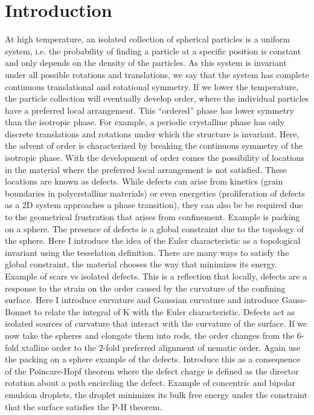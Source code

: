 \chapter{Introduction}
At high temperature, an isolated collection of spherical particles is a uniform system, i.e. the probability of finding a particle at a specific position is constant and only depends on the density of the particles.
As this system is invariant under all possible rotations and translations, we say that the system has complete continuous translational and rotational symmetry.
If we lower the temperature, the particle collection will eventually develop order, where the individual particles have a preferred local arrangement.
This ``ordered'' phase has lower symmetry than the isotropic phase.
For example, a periodic crystalline phase has only discrete translations and rotations under which the structure is invariant.
Here, the advent of order is characterized by breaking the continuous symmetry of the isotropic phase.
With the development of order comes the possibility of locations in the material where the preferred local arrangement is not satisfied.
These locations are known as defects.
While defects can arise from kinetics (grain boundaries in polycrstalline materials) or even energetics (proliferation of defects as a 2D system approaches a phase transition), they can also be be required due to the geometrical frustration that arises from confinement.
Example is packing on a sphere.
The presence of defects is a global constraint due to the topology of the sphere.
Here I introduce the idea of the Euler characteristic as a topological invariant using the tesselation definition.
There are many ways to satisfy the global constraint, the material chooses the way that minimizes its energy.
Example of scars vs isolated defects.
This is a reflection that locally, defects are a response to the strain on the order caused by the curvature of the confining surface.
Here I introduce curvature and Gaussian curvature and introduce Gauss-Bonnet to relate the integral of K with the Euler characteristic.
Defects act as isolated sources of curvature that interact with the curvature of the surface.
If we now take the spheres and elongate them into rods, the order changes from the 6-fold xtalline order to the 2-fold preferred alignment of nematic order.
Again use the packing on a sphere example of the defects.
Introduce this as a consequence of the Poincare-Hopf theorem where the defect charge is defined as the director rotation about a path encircling the defect.
Example of concentric and bipolar emulsion droplets, the droplet minimizes its bulk free energy under the constraint that the surface satisfies the P-H theorem.
